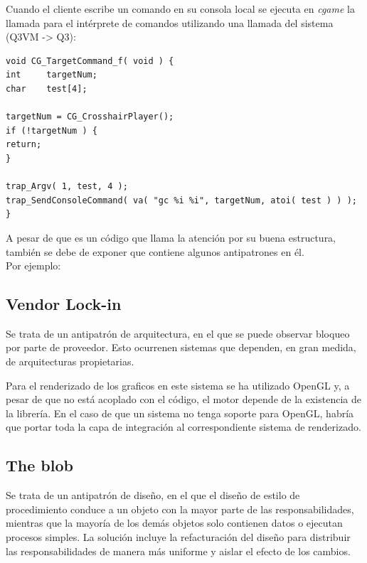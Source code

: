 \documentclass[a4paper,12pt]{report}
\begin{document}
	Cuando el cliente escribe un comando en su consola local se ejecuta en \textit{cgame} la llamada para el intérprete de comandos utilizando una llamada del sistema (Q3VM -> Q3):\\
	
	\begin{lstlisting}[style=C, numbers=none]
void CG_TargetCommand_f( void ) {
int		targetNum;
char	test[4];

targetNum = CG_CrosshairPlayer();
if (!targetNum ) {
return;
}

trap_Argv( 1, test, 4 );
trap_SendConsoleCommand( va( "gc %i %i", targetNum, atoi( test ) ) );
}
	\end{lstlisting}
	
	
	
	
A pesar de que es un código que llama la atención por su buena estructura, también se debe de exponer que contiene algunos antipatrones en él.\\

Por ejemplo:\\

\subsection{Vendor Lock-in}

Se trata de un antipatrón de arquitectura, en el que se puede observar bloqueo por parte de proveedor. Esto ocurrenen sistemas que dependen, en gran medida, de arquitecturas propietarias.

Para el renderizado de los graficos en este sistema se ha utilizado OpenGL y, a pesar de que no está acoplado con el código, el motor depende de la existencia de la librería. En el caso de que un sistema no tenga soporte para OpenGL, habría que portar toda la capa de integración al correspondiente sistema de renderizado.  \\


\subsection{The blob}

Se trata de un antipatrón de diseño, en el que el diseño de estilo de procedimiento conduce a un objeto con la mayor parte de las responsabilidades, mientras que la mayoría de los demás objetos solo contienen datos o ejecutan procesos simples. La solución incluye la refacturación del diseño para distribuir las responsabilidades de manera más uniforme y aislar el efecto de los cambios.
\end{document}
